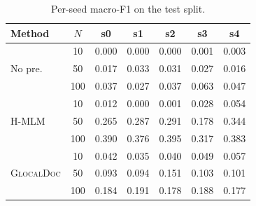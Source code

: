 \documentclass[conference]{IEEEtran}
\newcommand{\glocal}{\textsc{GlocalDoc}}
\newcommand{\hmlm}{\mbox{H-MLM}}
\begin{document}
\begin{table}[t]
\centering
\caption{Per-seed macro-F1 on the test split.}
\label{tab:perseed}
\footnotesize
\begin{tabular}{l c c c c c c}
\toprule
Method & $N$ & s0 & s1 & s2 & s3 & s4 \\
\midrule
\multirow{3}{*}{No pre.}
 & 10  & 0.000 & 0.000 & 0.000 & 0.001 & 0.003 \\
 & 50  & 0.017 & 0.033 & 0.031 & 0.027 & 0.016 \\
 & 100 & 0.037 & 0.027 & 0.037 & 0.063 & 0.047 \\
\midrule
\multirow{3}{*}{\hmlm{}}
 & 10  & 0.012 & 0.000 & 0.001 & 0.028 & 0.054 \\
 & 50  & 0.265 & 0.287 & 0.291 & 0.178 & 0.344 \\
 & 100 & 0.390 & 0.376 & 0.395 & 0.317 & 0.383 \\
\midrule
\multirow{3}{*}{\glocal{}}
 & 10  & 0.042 & 0.035 & 0.040 & 0.049 & 0.057 \\
 & 50  & 0.093 & 0.094 & 0.151 & 0.103 & 0.101 \\
 & 100 & 0.184 & 0.191 & 0.178 & 0.188 & 0.177 \\
\bottomrule
\end{tabular}
\end{table}



\end{document}
